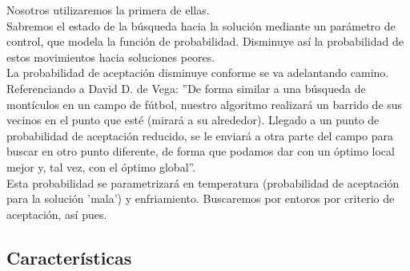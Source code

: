 \documentclass{llncs}
\begin{document}
Nosotros utilizaremos la primera de ellas. \\

Sabremos el estado de la b\'{u}squeda hacia la soluci\'{o}n mediante un par\'{a}metro de control, que modela la funci\'{o}n de probabilidad. Disminuye as\'{i} la probabilidad de estos movimientos hacia soluciones peores.\\

La probabilidad de aceptaci\'{o}n disminuye conforme se va adelantando camino. \\

Referenciando a David D. de Vega: ''De forma similar a una b\'{u}squeda de mont\'{i}culos en un campo de f\'{u}tbol, nuestro algoritmo realizar\'{a} un barrido de sus vecinos en el punto que est\'{e} (mirar\'{a} a su alrededor). Llegado a un punto de probabilidad de aceptaci\'{o}n reducido, se le enviar\'{a} a otra parte del campo para buscar en otro punto diferente, de forma que podamos dar con un \'{o}ptimo local mejor y, tal vez, con el \'{o}ptimo global''. \\

Esta probabilidad se parametrizar\'{a} en temperatura (probabilidad de aceptaci\'{o}n para la soluci\'{o}n 'mala') y enfriamiento. Buscaremos por entoros por criterio de aceptaci\'{o}n, as\'{i} pues. \\

\subsection*{Caracter\'{i}sticas}
\end{document}
